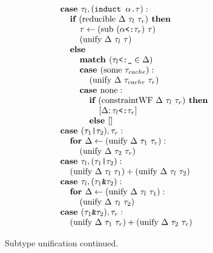 \documentclass[acmsmall]{acmart}
\begin{document}
\begin{figure*}[h]
\[\begin{array}[t]{@{} l}
    \\

    \I \B{case } \tau_l, (\code{induct $\alpha$.$\tau$}) :
    \\
    \I\I \B{if } (\F{reducible } \Delta\ \tau_l\ \tau_r) \B{ then }
    \\
    \I\I\I \tau \leftarrow (\text{sub } (\code{$\alpha$<:$\tau_r$})\ \tau) 
    \\
    \I\I\I (\F{unify } \Delta\ \tau_l\ \tau)
    \\
    \I\I \B{else }
    \\
    \I\I\I \B{match } (\code{$\tau_l$<:\_} \in \Delta)
    \\
    \I\I\I \B{case } (\F{some } \tau_{cache}) :
    \\
    \I\I\I\I (\F{unify } \Delta\ \tau_{cache}\ \tau_r)
    \\
    \I\I\I \B{case } \F{none} :
    \\
    \I\I\I\I \B{if } (\F{constraintWF } \Delta\ \tau_l\ \tau_r) \B{ then }
    \\
    \I\I\I\I\I [\Delta;\code{$\tau_l$<:$\tau_r$}]
    \\
    \I\I\I\I \B{else } [] 

    \\

    \I \B{case } (\code{$\tau_1$|$\tau_2$}), \tau_r : 
    \\
    \I\I \B{for } \Delta \leftarrow (\F{unify } \Delta\ \tau_1\ \tau_r):
    \\
    \I\I\I (\F{unify } \Delta\ \tau_2\ \tau_r) 

    \\

    \I \B{case } \tau_l, (\code{$\tau_1$|$\tau_2$}) : 
    \\
    \I\I (\F{unify } \Delta\ \tau_l\ \tau_1) + (\F{unify } \Delta\ \tau_l\ \tau_2) 

    \\

    \I \B{case } \tau_l, (\code{$\tau_1$\&$\tau_2$}) : 
    \\
    \I\I \B{for } \Delta \leftarrow (\F{unify } \Delta\ \tau_l\ \tau_1):
    \\
    \I\I\I (\F{unify } \Delta\ \tau_l\ \tau_2) 

    \\

    \I \B{case } (\code{$\tau_1$\&$\tau_2$}), \tau_r : 
    \\
    \I\I (\F{unify } \Delta\ \tau_1\ \tau_r) + (\F{unify } \Delta\ \tau_2\ \tau_r) 
\end{array}
\]

\caption{Subtype unification continued.}
\end{figure*}
\end{document}
